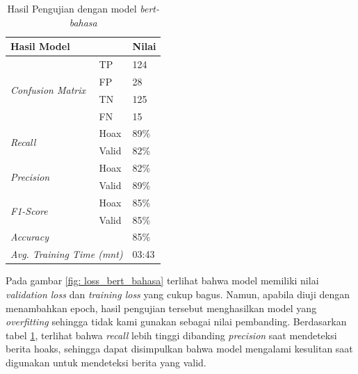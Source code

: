 \begin{table}[h]
    \caption{Hasil Pengujian dengan model \textit{bert-bahasa}}
    \label{tab: loss_bahasa}
    \centering
    \begin{tabular}{|l|l|l|}
        \hline
        \multicolumn{2}{|l|}{\textbf{Hasil Model}}              & \textbf{Nilai}        \\ \hline
        \multirow{4}{*}{\textit{Confusion Matrix}}              & TP             & 124  \\ \cline{2-3}
                                                                & FP             & 28   \\ \cline{2-3}
                                                                & TN             & 125  \\ \cline{2-3}
                                                                & FN             & 15   \\ \hline
        \multirow{2}{*}{\textit{Recall}}                        & Hoax           & 89\% \\ \cline{2-3}
                                                                & Valid          & 82\% \\ \hline
        \multirow{2}{*}{\textit{Precision}}                     & Hoax           & 82\% \\ \cline{2-3}
                                                                & Valid          & 89\% \\ \hline
        \multirow{2}{*}{\textit{F1-Score}}                      & Hoax           & 85\% \\ \cline{2-3}
                                                                & Valid          & 85\% \\ \hline
        \multicolumn{2}{|l|}{\textit{Accuracy}}                 & 85\%                  \\ \hline
        \multicolumn{2}{|l|}{\textit{Avg. Training Time (mnt)}} & 03:43                 \\ \hline
    \end{tabular}
\end{table}

Pada gambar \ref{fig: loss_bert_bahasa} terlihat bahwa model memiliki nilai \textit{validation loss} dan \textit{training loss} yang cukup bagus. Namun, apabila diuji dengan menambahkan epoch, hasil pengujian tersebut menghasilkan model yang \textit{overfitting} sehingga tidak kami gunakan sebagai nilai pembanding. Berdasarkan tabel \ref{tab: loss_bahasa}, terlihat bahwa \textit{recall} lebih tinggi dibanding \textit{precision} saat mendeteksi berita hoaks, sehingga dapat disimpulkan bahwa model mengalami kesulitan saat digunakan untuk mendeteksi berita yang valid.

